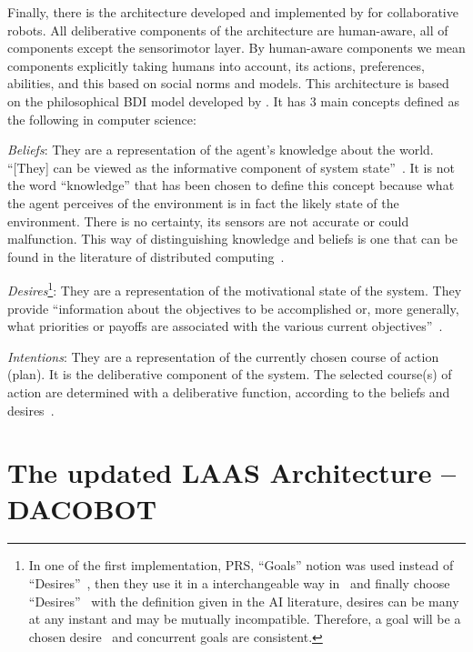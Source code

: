 \documentclass[a4paper,11pt,twoside]{StyleThese}
\begin{document}
Finally, there is the architecture developed and implemented by \cite{lemaignan_2017_artificial} for collaborative robots. All deliberative components of the architecture are human-aware, \ie all of components except the sensorimotor layer. By human-aware components we mean components explicitly taking humans into account, \ie its actions, preferences, abilities, and this based on social norms and models. This architecture is based on the philosophical BDI model developed by \cite{bratman_1987_intention,bratman_1988_plans}. It has 3 main concepts defined as the following in computer science:
\begin{bulletList}
	\item \emph{Beliefs}: They are a representation of the agent’s knowledge about the world. ``[They] can be viewed as the informative component of system state''~\citep[p.~313]{rao_1995_bdi}. It is not the word ``knowledge'' that has been chosen to define this concept because what the agent perceives of the environment is in fact the likely state of the environment. There is no certainty, its sensors are not accurate or could malfunction. This way of distinguishing knowledge and beliefs is one that can be found in the literature of distributed computing~\citep{lamarre_1994_knowledge}.
	\item \emph{Desires}\footnote{In one of the first implementation, PRS, ``Goals'' notion was used instead of ``Desires''~\citep{georgeff_1989_decision}, then they use it in a interchangeable way in~\citep{georgeff_1991_modeling} and finally choose ``Desires''~\citep{rao_1995_bdi} with the definition given in the AI literature, \eg desires can be many at any instant and may be mutually incompatible. Therefore, a goal will be a chosen desire~\citep{cohen_1990_intention} and concurrent goals are consistent.}: They are a representation of the motivational state of the system. They provide ``information about the objectives to be accomplished or, more generally, what priorities or payoffs are associated with the various current objectives''~\citep{rao_1995_bdi}. 
	\item \emph{Intentions}: They are a representation of the currently chosen course of action (plan). It is the deliberative component of the system. The selected course(s) of action are determined with a deliberative function, according to the beliefs and desires~\cite[p.~313]{rao_1995_bdi}.
\end{bulletList}



\section{The updated LAAS Architecture -- DACOBOT}\label{chap3:sec:rob_archi}
\end{document}
